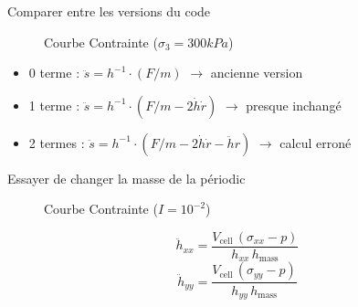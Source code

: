 \documentclass[10pt]{beamer}
\begin{document}
\begin{frame}{Comparer entre les versions du code}
    \begin{figure}[h]
        \centering
        \scalebox{0.5}{}
        \caption{Courbe Contrainte ($\sigma_3 = 300kPa$)}
    \end{figure}
    \begin{itemize}
        \item 0 terme : $\ddot{s} = h^{-1} \cdot (F/m)$ $\rightarrow$ ancienne version
        \item 1 terme : $\ddot{s} = h^{-1} \cdot (F/m - 2 \dot{h} \dot{r})$ $\rightarrow$ presque inchangé
        \item 2 termes : $\ddot{s} = h^{-1} \cdot (F/m - 2 \dot{h} \dot{r} - \ddot{h} r)$ $\rightarrow$ calcul erroné
    \end{itemize}
\end{frame}

\begin{frame}{Essayer de changer la masse de la périodic}
    \begin{figure}[h]
        \centering
        \scalebox{0.5}{}
        \caption{Courbe Contrainte ($I = 10^{-2}$)}
    \end{figure}
    \[
        \ddot{h}_{xx} = \frac{V_{\text{cell}} \, (\sigma_{xx} - p)}{h_{xx} \, h_{\text{mass}}}
    \]
    \[
        \ddot{h}_{yy} = \frac{V_{\text{cell}} \, (\sigma_{yy} - p)}{h_{yy} \, h_{\text{mass}}}
    \]

\end{frame}
\end{document}
